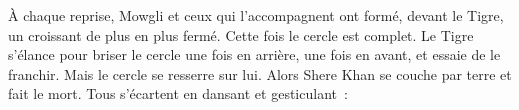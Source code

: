 {\footnotesize À chaque reprise, Mowgli et ceux qui l'accompagnent ont formé, devant le Tigre, un croissant de plus en plus fermé. Cette fois le cercle est complet. Le Tigre s'élance pour briser le cercle une fois en arrière, une fois en avant, et essaie de le franchir. Mais le cercle se resserre sur lui. Alors Shere Khan se couche par terre et fait le mort. Tous s'écartent en dansant et gesticulant :\par\medskip}

\setcounter{numerocouplet}{34}

